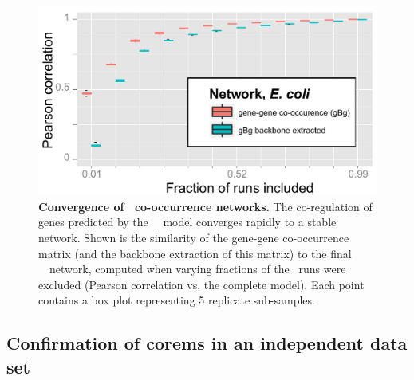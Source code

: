 \begin{figure}[h!]
\centering
\includegraphics[width=0.75\linewidth]{figures/gBg_network_converge.pdf}
\caption[Convergence of \egrine\ gene co-occurrence networks.]  {{\bf Convergence of \egrine\ co-occurrence networks.} The co-regulation of genes predicted by the \eco\ \egrine\ model converges rapidly to a stable network. Shown is the similarity of the gene-gene co-occurrence matrix (and the backbone extraction of this matrix) to the final \egrine\ \eco\ network, computed when varying fractions of the \cm\ runs were excluded (Pearson correlation vs. the complete model). Each point contains a box plot representing 5 replicate sub-samples.} 
\label{fig:gBg_network_converge}
\end{figure}

\subsection{Confirmation of corems in an independent data set}

